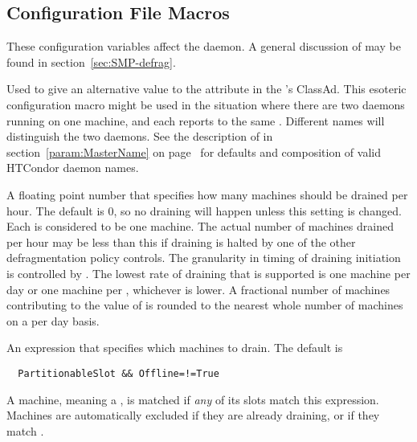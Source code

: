 \subsection{\label{sec:Config-defrag} Configuration File Macros}
These configuration variables affect the  daemon.  A general
discussion of  may be found in section~\ref{sec:SMP-defrag}.

\begin{description}

\label{param:DefragName}
\item[\Macro{DEFRAG\_NAME}]
  Used to give an alternative value to the  attribute
  in the 's ClassAd.
  This esoteric configuration macro might be used in the situation
  where there are two  daemons running on one machine,
  and each reports to the same .
  Different names will distinguish the two daemons.
  See the description of  in
  section~\ref{param:MasterName} on page~\pageref{param:MasterName}
  for defaults and composition of valid HTCondor daemon names.

\label{param:DefragDrainingMachinesPerHour}
\item[\Macro{DEFRAG\_DRAINING\_MACHINES\_PER\_HOUR}] A floating point
  number that specifies how many machines should be drained per hour.
  The default is 0, so no draining will happen unless this setting is changed.
  Each  is considered to be one machine.  
  The actual number of machines drained per hour may be less than this if
  draining is halted by one of the other defragmentation policy controls.
  The granularity in timing of draining initiation is
  controlled by .  The lowest rate of draining
  that is supported is one machine per day or one machine per
  , whichever is lower.
  A fractional number of machines contributing to the value of 
   is rounded to the nearest
  whole number of machines on a per day basis.

\label{param:DefragRequirements}
\item[\Macro{DEFRAG\_REQUIREMENTS}] An expression that specifies which
  machines to drain.  The default is 
\begin{verbatim}
  PartitionableSlot && Offline=!=True  
\end{verbatim}
  A machine, meaning a ,
  is matched if \emph{any} of its slots match this expression. 
  Machines are automatically excluded if they are already draining,
  or if they match .


\end{description}
